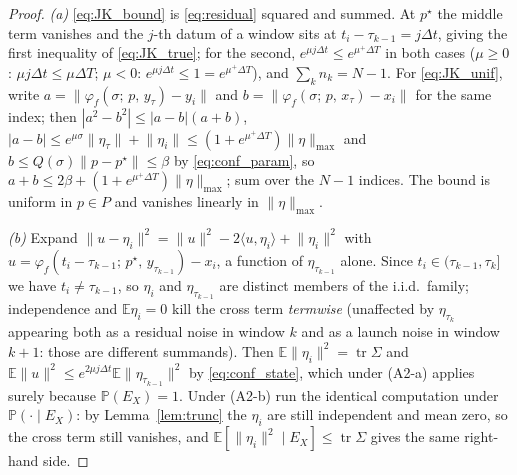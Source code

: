 \documentclass[11pt]{article}
\theoremstyle{remark}\newtheorem{remark}{Remark}
\newcommand{\pstar}{p^\star}
\newcommand{\norm}[1]{\lVert #1\rVert}
\newcommand{\flow}[3]{\varphi_f(#1;\,#2,\,#3)}
\begin{document}
\begin{proof}
\emph{(a)} \eqref{eq:JK_bound} is \eqref{eq:residual} squared and summed. At $\pstar$ the middle term vanishes and the $j$-th datum of a window sits at $t_i-\tau_{k-1}=j\Delta t$, giving the first inequality of \eqref{eq:JK_true}; for the second, $e^{\mu j\Delta t}\le e^{\mu^{+}\Delta T}$ in both cases ($\mu\ge0$: $\mu j\Delta t\le\mu\Delta T$; $\mu<0$: $e^{\mu j\Delta t}\le1=e^{\mu^{+}\Delta T}$), and $\sum_k n_k=N-1$. For \eqref{eq:JK_unif}, write $a=\norm{\flow{\sigma}{p}{y_\tau}-y_i}$ and $b=\norm{\flow{\sigma}{p}{x_\tau}-x_i}$ for the same index; then $|a^2-b^2|\le|a-b|(a+b)$, $|a-b|\le e^{\mu\sigma}\norm{\eta_\tau}+\norm{\eta_i}\le(1+e^{\mu^{+}\Delta T})\norm\eta_{\max}$ and $b\le Q(\sigma)\norm{p-\pstar}\le\beta$ by \eqref{eq:conf_param}, so $a+b\le2\beta+(1+e^{\mu^{+}\Delta T})\norm\eta_{\max}$; sum over the $N-1$ indices. The bound is uniform in $p\in P$ and vanishes linearly in $\norm\eta_{\max}$.

\emph{(b)} Expand $\norm{u-\eta_i}^2=\norm u^2-2\langle u,\eta_i\rangle+\norm{\eta_i}^2$ with $u=\flow{t_i-\tau_{k-1}}{\pstar}{y_{\tau_{k-1}}}-x_i$, a function of $\eta_{\tau_{k-1}}$ alone. Since $t_i\in(\tau_{k-1},\tau_k]$ we have $t_i\neq\tau_{k-1}$, so $\eta_i$ and $\eta_{\tau_{k-1}}$ are distinct members of the i.i.d.\ family; independence and $\mathbb E\eta_i=0$ kill the cross term \emph{termwise} (unaffected by $\eta_{\tau_k}$ appearing both as a residual noise in window $k$ and as a launch noise in window $k+1$: those are different summands). Then $\mathbb E\norm{\eta_i}^2=\operatorname{tr}\Sigma$ and $\mathbb E\norm u^2\le e^{2\mu j\Delta t}\mathbb E\norm{\eta_{\tau_{k-1}}}^2$ by \eqref{eq:conf_state}, which under (A2-a) applies surely because $\mathbb P(E_X)=1$. Under (A2-b) run the identical computation under $\mathbb P(\cdot\mid E_X)$: by Lemma~\ref{lem:trunc} the $\eta_i$ are still independent and mean zero, so the cross term still vanishes, and $\mathbb E[\norm{\eta_i}^2\mid E_X]\le\operatorname{tr}\Sigma$ gives the same right-hand side.
\end{proof}
\end{document}
